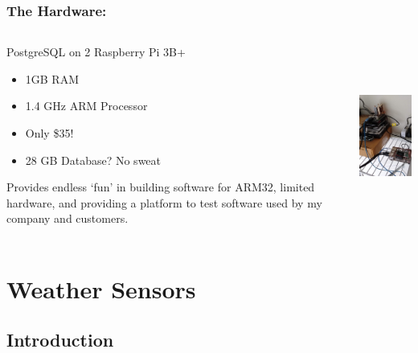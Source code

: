 \documentclass[aspectratio=169]{beamer}
\begin{document}
\begin{frame}[fragile]
  \frametitle{The Hardware:}
  \begin{columns}[T]
    \begin{column}[T]{0.5\paperwidth}
      PostgreSQL on 2 Raspberry Pi 3B+
      \begin{itemize}
        \item{1GB RAM}
        \item{1.4 GHz ARM Processor}
        \item{Only \$35!}
        \item{28 GB Database? No sweat}
      \end{itemize}
      \vfill
      Provides endless `fun' in building software for ARM32, limited hardware, and
      providing a platform to test software used by my company and customers.
    \end{column}
    \begin{column}[T]{0.45\paperwidth}
      \includegraphics[height=6cm]{images/datacloset.jpg}
    \end{column}
  \end{columns}
\end{frame}

\section{Weather Sensors}
\frame{\sectionpage}
\subsection{Introduction}
\end{document}

